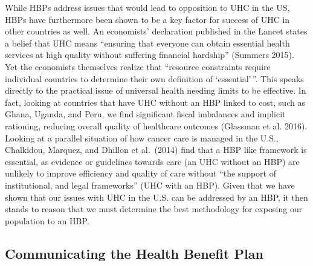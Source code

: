 \documentclass[
]{article}
\begin{document}
While HBPs address issues that would lead to opposition to UHC in the
US, HBPs have furthermore been shown to be a key factor for success of
UHC in other countries as well. An economists' declaration published in
the Lancet states a belief that UHC means ``ensuring that everyone can
obtain essential health services at high quality without suffering
financial hardship'' (Summers 2015). Yet the economists themselves
realize that ``resource constraints require individual countries to
determine their own definition of `essential'\,''. This speaks directly
to the practical issue of universal health needing limits to be
effective. In fact, looking at countries that have UHC without an HBP
linked to cost, such as Ghana, Uganda, and Peru, we find significant
fiscal imbalances and implicit rationing, reducing overall quality of
healthcare outcomes (Glassman et al. 2016). Looking at a parallel
situation of how cancer care is managed in the U.S., Chalkidou, Marquez,
and Dhillon et al.~(2014) find that a HBP like framework is essential,
as evidence or guidelines towards care (an UHC without an HBP) are
unlikely to improve efficiency and quality of care without ``the support
of institutional, and legal frameworks'' (UHC with an HBP). Given that
we have shown that our issues with UHC in the U.S. can be addressed by
an HBP, it then stands to reason that we must determine the best
methodology for exposing our population to an HBP.

\hypertarget{communicating-the-health-benefit-plan}{%
\subsection{Communicating the Health Benefit
Plan}\label{communicating-the-health-benefit-plan}}
\end{document}
